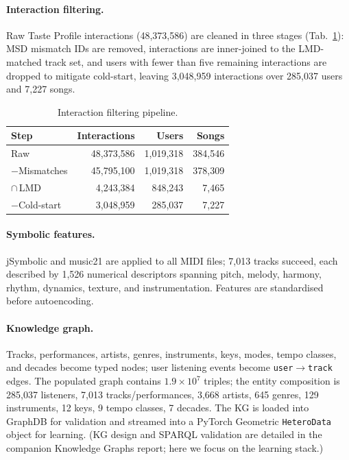 \documentclass[10pt,twocolumn,letterpaper]{article}
\begin{document}
\paragraph{Interaction filtering.} Raw Taste Profile interactions
(48{,}373{,}586) are cleaned in three stages (Tab.~\ref{tab:filtering}): MSD
mismatch IDs are removed, interactions are inner-joined to the LMD-matched track
set, and users with fewer than five remaining interactions are dropped to mitigate
cold-start, leaving 3{,}048{,}959 interactions over 285{,}037 users and 7{,}227
songs.

\begin{table}[t]
\centering\footnotesize
\caption{Interaction filtering pipeline.}
\label{tab:filtering}
\setlength{\tabcolsep}{5pt}
\renewcommand{\arraystretch}{1.1}
\begin{tabular}{lrrr}
\toprule
\textbf{Step} & \textbf{Interactions} & \textbf{Users} & \textbf{Songs}\\
\midrule
Raw            & 48{,}373{,}586 & 1{,}019{,}318 & 384{,}546\\
$-$Mismatches  & 45{,}795{,}100 & 1{,}019{,}318 & 378{,}309\\
$\cap$\,LMD     & 4{,}243{,}384  &   848{,}243 &   7{,}465\\
$-$Cold-start  & 3{,}048{,}959  &   285{,}037 &   7{,}227\\
\bottomrule
\end{tabular}
\end{table}

\paragraph{Symbolic features.} jSymbolic and music21 are applied to all MIDI
files; 7{,}013 tracks succeed, each described by 1{,}526 numerical descriptors
spanning pitch, melody, harmony, rhythm, dynamics, texture, and instrumentation.
Features are standardised before autoencoding.

\paragraph{Knowledge graph.} Tracks, performances, artists, genres, instruments,
keys, modes, tempo classes, and decades become typed nodes; user listening events
become \texttt{user}$\to$\texttt{track} edges. The populated graph contains
$1.9\!\times\!10^{7}$ triples; the entity composition is 285{,}037 listeners,
7{,}013 tracks/performances, 3{,}668 artists, 645 genres, 129 instruments, 12 keys,
9 tempo classes, 7 decades. The KG is loaded into GraphDB for validation and
streamed into a PyTorch Geometric \texttt{HeteroData} object for learning. (KG
design and SPARQL validation are detailed in the companion Knowledge Graphs
report; here we focus on the learning stack.)
\end{document}
